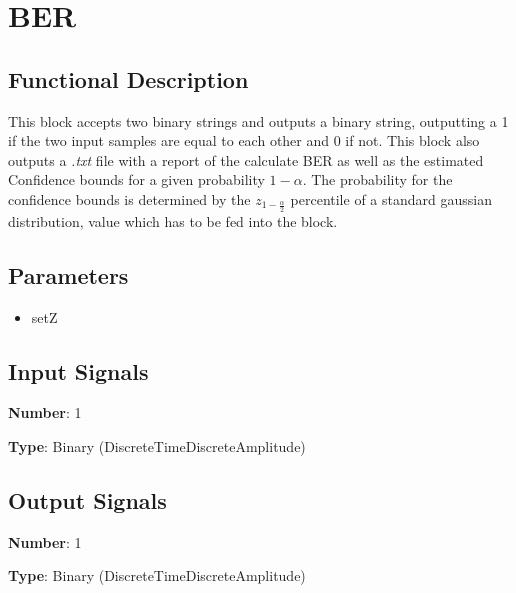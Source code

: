 \section{BER}

\subsection*{Functional Description}

This block accepts two binary strings and outputs a binary string, outputting a 1 if the two input samples are equal to each other and 0 if not. This block also outputs a \textit{.txt} file with a report of the calculate BER as well as the estimated Confidence bounds for a given probability $1-\alpha$. The probability for the confidence bounds is determined by the $z_{1-\frac{\alpha}{2}}$ percentile of a standard gaussian distribution, value which has to be fed into the block.


\subsection*{Parameters}

\begin{multicols}{2}
	\begin{itemize}
		\item setZ
	\end{itemize}
\end{multicols}

\subsection*{Input Signals}

\textbf{Number}: 1

\textbf{Type}: Binary (DiscreteTimeDiscreteAmplitude)

\subsection*{Output Signals}

\textbf{Number}: 1

\textbf{Type}: Binary (DiscreteTimeDiscreteAmplitude)